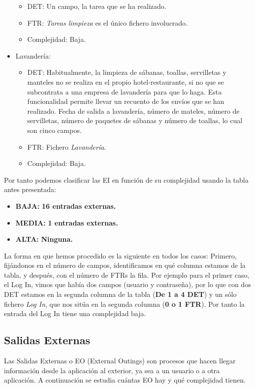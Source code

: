 \documentclass[spanish,a4paper,12pt]{report}	%
\begin{document}
\begin{itemize}
		\begin{itemize}
 			\item{DET:} Un campo, la tarea que se ha realizado.
			\item{FTR:} \textit{Tareas limpieza} es el único fichero involucrado.
			\item{Complejidad:} Baja.
		\end{itemize}
		\item{Lavandería:} 
		\begin{itemize}
 			\item{DET:} Habitualmente, la limpieza de sábanas, toallas, servilletas y manteles no se realiza en el propio hotel-restaurante, si no que se subcontrata a una empresa de lavandería para que lo haga. Esta funcionalidad permite llevar un recuento de los envíos que se han realizado. Fecha de salida a lavandería, número de mateles, número de servilletas, número de paquetes de sábanas y número de toallas, lo cual son cinco campos.
			\item{FTR:} Fichero \textit{Lavandería}.
			\item{Complejidad:} Baja.
		\end{itemize}		
	\end{itemize}

	Por tanto podemos clasificar las EI en función de su complejidad usando la tabla antes presentada:
	\begin{itemize}
	\item{\textbf{BAJA:}} \textbf{16 entradas externas.}
	\item{\textbf{MEDIA:}} \textbf{1 entradas externas.}
	\item{\textbf{ALTA:}} \textbf{Ninguna.}
	\end{itemize}
	
	La forma en que hemos procedido es la siguiente en todos los casos: Primero, fijándonos en el número de campos, identificamos en qué columna estamos de la tabla, y después, con el número de FTRs la fila. Por ejemplo para el primer caso, el Log In, vimos que había dos campos (usuario y contraseña), por lo que con dos DET estamos en la segunda columna de la tabla (\textbf{De 1 a 4 DET}) y un sólo fichero \textit{Log In}, que nos sitúa en la segunda columna (\textbf{0 o 1 FTR}). Por tanto la entrada del Log In tiene una complejidad baja.

	\subsection{Salidas Externas}
	Las Salidas Externas o EO (External Outings) son procesos que hacen llegar información desde la aplicación al exterior, ya sea a un usuario o a otra aplicación. A continuación se estudia cuántas EO hay y qué complejidad tienen. 
\end{document}
